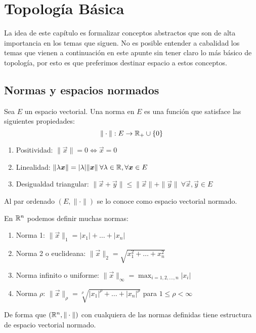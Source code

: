 \chapter{Topolog\'ia B\'asica}\label{cap4}

La idea de este cap\'itulo es formalizar conceptos abstractos que son de alta importancia en los temas que siguen. No es posible entender a cabalidad los temas que vienen a continuaci\'on en este apunte sin tener claro lo m\'as b\'asico de topolog\'ia, por esto es que preferimos destinar espacio a estos conceptos.

\section{Normas y espacios normados}

\begin{definicion}\label{defnorma}
Sea $E$ un espacio vectorial. Una norma en $E$ es una funci\'on que satisface las siguientes propiedades:
\[\| \cdot\|:E\to\mathbb{R}_+\cup\{0\}\]
\begin{enumerate}
    \item Positividad: $\|\vec{x}\|=0\Leftrightarrow \vec{x}=0$
    \item Linealidad: $\|\lambda \boldsymbol{x}\|=|\lambda|\|\boldsymbol{x}\|\: \forall\lambda\in\mathbb{R} ,\forall \boldsymbol{x}\in E$
    \item Desigualdad triangular: $\|\vec{x}+\vec{y}\|\leq\|\vec{x}\|+\|\vec{y}\|\:\forall \vec{x},\vec{y}\in E$ 
\end{enumerate}
Al par ordenado $(E,\|\cdot\|)$ se lo conoce como espacio vectorial normado.
\end{definicion}

\begin{ejemplo}
En $\mathbb{R}^n$ podemos definir muchas normas:
\begin{enumerate}
\item Norma 1: $\|\vec{x}\|_1=|x_1|+\ldots +|x_n|$
\item Norma 2 o euclideana: $\|\vec{x}\|_2=\sqrt{x_1^2+\ldots +x_n^2}$
\item Norma infinito o uniforme: $\|\vec{x}\|_\infty = \max_{i=1,2,\ldots ,n} |x_i|$
\item Norma $\rho$: $\|\vec{x}\|_\rho =\sqrt[\rho]{|x_1|^\rho +\ldots +|x_n|^\rho}$ para $1\leq \rho <\infty$
\end{enumerate}
De forma que $(\mathbb{R}^n,\|\cdot\|)$ con cualquiera de las normas definidas tiene estructura de espacio vectorial normado.
\end{ejemplo}

